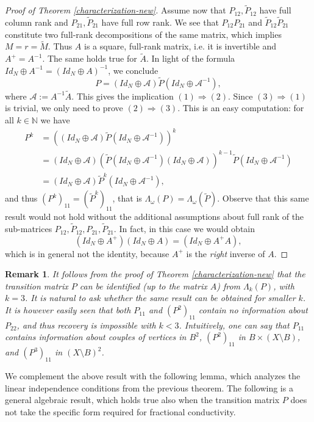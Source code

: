 \documentclass[a4paper,11pt,oneside]{amsart}
\newtheorem{remark}[theorem]{Remark}
\newcommand{\N}{{\mathbb N}}
\begin{document}
\begin{proof}[Proof of Theorem \ref{characterization-new}]
Assume now that $P_{12}, \tilde P_{12}$ have full column rank and $P_{21}, \tilde P_{21}$ have full row rank. We see that $ P_{12}P_{21}$ and $\tilde P_{12}\tilde P_{21}$ constitute two full-rank decompositions of the same matrix, which implies $M=r = \tilde M$. Thus $A$ is a square, full-rank matrix, i.e. it is invertible and $A^+ = A^{-1}$. The same holds true for $\tilde A$. In light of the formula $Id_N\oplus A^{-1} = (Id_N\oplus A)^{-1}$, we conclude   $$ P = (Id_N\oplus \mathcal A) \tilde P (Id_N\oplus \mathcal A^{-1} ),$$
where $\mathcal A := A^{-1}\tilde A$.  This gives the implication $(1)\Rightarrow (2)$. Since $(3)\Rightarrow (1)$ is trivial, we only need to prove $(2)\Rightarrow (3)$. This is an easy computation: for all $k\in\N$ we have
\begin{align*}
    P^k & = \left( (Id_N\oplus \mathcal A) \tilde P (Id_N\oplus \mathcal A^{-1} ) \right)^k
    \\ & = (Id_N\oplus \mathcal A) \left( \tilde P (Id_N\oplus \mathcal A^{-1} )(Id_N\oplus \mathcal A)  \right)^{k-1} \tilde P (Id_N\oplus \mathcal A^{-1} ) 
    \\ & = (Id_N\oplus \mathcal A) \tilde P^k (Id_N\oplus \mathcal A^{-1} ) ,
\end{align*}
and thus $(P^k)_{11} = (\tilde P^k)_{11}$, that is $\Lambda_\omega(P)=\Lambda_\omega(\tilde P)$. Observe that this same result would not hold without the additional assumptions about full rank of the sub-matrices $P_{12},\tilde P_{12}, P_{21},\tilde P_{21}$. In fact, in this case we would obtain
$$ (Id_N\oplus A^+)(Id_N\oplus A) = (Id_N \oplus A^+A), $$
which is in general not the identity, because $A^+$ is the \emph{right} inverse of $A$.
\end{proof}

\begin{remark}\label{rmk:intuition}
It follows from the proof of Theorem \ref{characterization-new} that the transition matrix $P$ can be identified (up to the matrix $ A$) from $\Lambda_k(P)$, with $k=3$. It is natural to ask whether the same result can be obtained for smaller $k$. It is however easily seen that both $P_{11}$ and $(P^2)_{11}$ contain no information about $P_{22}$, and thus recovery is impossible with $k<3$. Intuitively, one can say that $P_{11}$ contains information about couples of vertices in $B^2$, $(P^2)_{11}$ in $B\times (X\setminus B)$, and  $(P^3)_{11}$ in $(X\setminus B)^2$. 
\end{remark}

We complement the above result with the following lemma, which analyzes the linear independence conditions from the previous theorem. The following is a general algebraic result, which holds true also when the transition matrix $P$ does not take the specific form required for fractional conductivity. 
\end{document}
